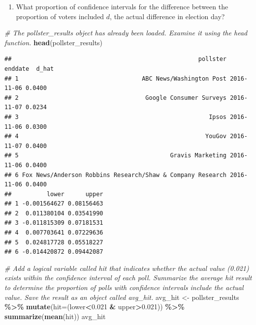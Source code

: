 \documentclass[
]{article}
\newenvironment{Shaded}{\begin{snugshade}}{\end{snugshade}}
\newcommand{\CommentTok}[1]{\textcolor[rgb]{0.56,0.35,0.01}{\textit{#1}}}
\newcommand{\DataTypeTok}[1]{\textcolor[rgb]{0.13,0.29,0.53}{#1}}
\newcommand{\FloatTok}[1]{\textcolor[rgb]{0.00,0.00,0.81}{#1}}
\newcommand{\KeywordTok}[1]{\textcolor[rgb]{0.13,0.29,0.53}{\textbf{#1}}}
\newcommand{\NormalTok}[1]{#1}
\newcommand{\OperatorTok}[1]{\textcolor[rgb]{0.81,0.36,0.00}{\textbf{#1}}}
\newcommand{\StringTok}[1]{\textcolor[rgb]{0.31,0.60,0.02}{#1}}
\providecommand{\tightlist}{%
  \setlength{\itemsep}{0pt}\setlength{\parskip}{0pt}}
\begin{document}
\begin{enumerate}
\def\labelenumi{\arabic{enumi}.}
\setcounter{enumi}{6}
\tightlist
\item
  What proportion of confidence intervals for the difference between the
  proportion of voters included \(d\), the actual difference in election
  day?
\end{enumerate}

\begin{Shaded}
\begin{Highlighting}[]
\CommentTok{\# The \textasciigrave{}pollster\_results\textasciigrave{} object has already been loaded. Examine it using the \textasciigrave{}head\textasciigrave{} function.}
\KeywordTok{head}\NormalTok{(pollster\_results)}
\end{Highlighting}
\end{Shaded}

\begin{verbatim}
##                                                     pollster    enddate  d_hat
## 1                                   ABC News/Washington Post 2016-11-06 0.0400
## 2                                    Google Consumer Surveys 2016-11-07 0.0234
## 3                                                      Ipsos 2016-11-06 0.0300
## 4                                                     YouGov 2016-11-07 0.0400
## 5                                           Gravis Marketing 2016-11-06 0.0400
## 6 Fox News/Anderson Robbins Research/Shaw & Company Research 2016-11-06 0.0400
##          lower      upper
## 1 -0.001564627 0.08156463
## 2  0.011380104 0.03541990
## 3 -0.011815309 0.07181531
## 4  0.007703641 0.07229636
## 5  0.024817728 0.05518227
## 6 -0.014420872 0.09442087
\end{verbatim}

\begin{Shaded}
\begin{Highlighting}[]
\CommentTok{\# Add a logical variable called \textasciigrave{}hit\textasciigrave{} that indicates whether the actual value (0.021) exists within the confidence interval of each poll. Summarize the average \textasciigrave{}hit\textasciigrave{} result to determine the proportion of polls with confidence intervals include the actual value. Save the result as an object called \textasciigrave{}avg\_hit\textasciigrave{}.}
\NormalTok{avg\_hit \textless{}{-}}\StringTok{ }\NormalTok{pollster\_results }\OperatorTok{\%\textgreater{}\%}\StringTok{ }\KeywordTok{mutate}\NormalTok{(}\DataTypeTok{hit=}\NormalTok{(lower}\OperatorTok{\textless{}}\FloatTok{0.021} \OperatorTok{\&}\StringTok{ }\NormalTok{upper}\OperatorTok{\textgreater{}}\FloatTok{0.021}\NormalTok{)) }\OperatorTok{\%\textgreater{}\%}\StringTok{ }\KeywordTok{summarize}\NormalTok{(}\KeywordTok{mean}\NormalTok{(hit))}
\NormalTok{avg\_hit}
\end{Highlighting}
\end{Shaded}
\end{document}
